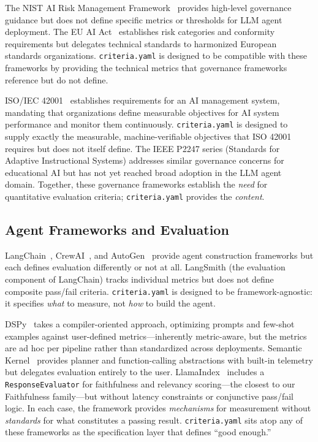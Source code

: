 \documentclass[11pt]{article}
\newcommand{\criteriayaml}{\texttt{criteria.yaml}}
\begin{document}
The NIST AI Risk Management Framework~\citep{nist2023airmf} provides high-level governance guidance but does not define specific metrics or thresholds for LLM agent deployment. The EU AI Act~\citep{euaiact2024} establishes risk categories and conformity requirements but delegates technical standards to harmonized European standards organizations. \criteriayaml{} is designed to be compatible with these frameworks by providing the technical metrics that governance frameworks reference but do not define.

ISO/IEC 42001~\citep{iso42001} establishes requirements for an AI management system, mandating that organizations define measurable objectives for AI system performance and monitor them continuously. \criteriayaml{} is designed to supply exactly the measurable, machine-verifiable objectives that ISO 42001 requires but does not itself define. The IEEE P2247 series (Standards for Adaptive Instructional Systems) addresses similar governance concerns for educational AI but has not yet reached broad adoption in the LLM agent domain. Together, these governance frameworks establish the \emph{need} for quantitative evaluation criteria; \criteriayaml{} provides the \emph{content}.

\subsection{Agent Frameworks and Evaluation}

LangChain~\citep{langchain2023}, CrewAI~\citep{crewai2024}, and AutoGen~\citep{autogen2023} provide agent construction frameworks but each defines evaluation differently or not at all. LangSmith (the evaluation component of LangChain) tracks individual metrics but does not define composite pass/fail criteria. \criteriayaml{} is designed to be framework-agnostic: it specifies \emph{what} to measure, not \emph{how} to build the agent.

DSPy~\citep{khattab2023dspy} takes a compiler-oriented approach, optimizing prompts and few-shot examples against user-defined metrics---inherently metric-aware, but the metrics are ad hoc per pipeline rather than standardized across deployments. Semantic Kernel~\citep{microsoft2023semantickernel} provides planner and function-calling abstractions with built-in telemetry but delegates evaluation entirely to the user. LlamaIndex~\citep{llamaindex2023} includes a \texttt{ResponseEvaluator} for faithfulness and relevancy scoring---the closest to our Faithfulness family---but without latency constraints or conjunctive pass/fail logic. In each case, the framework provides \emph{mechanisms} for measurement without \emph{standards} for what constitutes a passing result. \criteriayaml{} sits atop any of these frameworks as the specification layer that defines ``good enough.''
\end{document}
